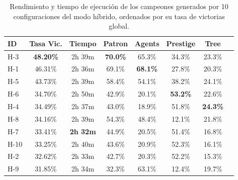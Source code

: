 \begin{table}[H]
	\centering
	\caption{Rendimiento y tiempo de ejecución de los campeones generados por 10 configuraciones del modo híbrido, ordenados por su tasa de victorias global.}
	\label{tab:hybrid_results}
	\begin{tabular}{@{}lccccccc@{}}
		\toprule
		\textbf{ID} & \textbf{Tasa Vic.} & \textbf{Tiempo} & \textbf{Patron} & \textbf{Agents} & \textbf{Prestige} & \textbf{Tree}   \\
		\midrule
		H-3         & \textbf{48.20\%}   & 2h 39m          & \textbf{70.0\%} & 65.3\%          & 34.3\%            & 23.3\%          \\
		H-1         & 46.31\%            & 2h 36m          & 69.1\%          & \textbf{68.1\%} & 27.8\%            & 20.3\%          \\
		H-5         & 43.73\%            & 2h 39m          & 58.4\%          & 54.1\%          & 38.2\%            & 24.1\%          \\
		H-6         & 34.70\%            & 2h 50m          & 42.9\%          & 20.1\%          & \textbf{53.2\%}   & 22.6\%          \\
		H-4         & 34.49\%            & 2h 37m          & 43.0\%          & 18.9\%          & 51.8\%            & \textbf{24.3\%} \\
		H-8         & 34.16\%            & 2h 39m          & 54.3\%          & 48.4\%          & 12.1\%            & 21.8\%          \\
		H-7         & 33.41\%            & \textbf{2h 32m} & 44.9\%          & 20.5\%          & 51.4\%            & 16.8\%          \\
		H-10        & 33.25\%            & 2h 40m          & 43.6\%          & 20.9\%          & 52.3\%            & 16.1\%          \\
		H-2         & 32.62\%            & 2h 33m          & 42.7\%          & 20.3\%          & 52.2\%            & 15.3\%          \\
		H-9         & 31.85\%            & 2h 34m          & 32.3\%          & 63.1\%          & 12.4\%            & 19.7\%          \\
		\bottomrule
	\end{tabular}
\end{table}

